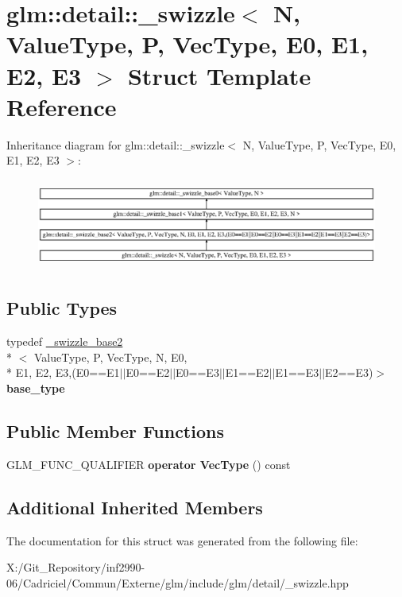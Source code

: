\hypertarget{structglm_1_1detail_1_1__swizzle}{\section{glm\-:\-:detail\-:\-:\-\_\-swizzle$<$ N, Value\-Type, P, Vec\-Type, E0, E1, E2, E3 $>$ Struct Template Reference}
\label{structglm_1_1detail_1_1__swizzle}
}
Inheritance diagram for glm\-:\-:detail\-:\-:\-\_\-swizzle$<$ N, Value\-Type, P, Vec\-Type, E0, E1, E2, E3 $>$\-:\begin{figure}[H]
\begin{center}
\leavevmode
\includegraphics[height=3.002681cm]{structglm_1_1detail_1_1__swizzle}
\end{center}
\end{figure}
\subsection*{Public Types}
\begin{DoxyCompactItemize}
\item 
\hypertarget{structglm_1_1detail_1_1__swizzle_acf7dfa9d7456eb833c247473c5a045f4}{typedef \hyperlink{structglm_1_1detail_1_1__swizzle__base2}{\-\_\-swizzle\-\_\-base2}\\*
$<$ Value\-Type, P, Vec\-Type, N, E0, \\*
E1, E2, E3,(E0==E1$\vert$$\vert$E0==E2$\vert$$\vert$E0==E3$\vert$$\vert$E1==E2$\vert$$\vert$E1==E3$\vert$$\vert$E2==E3)$>$ {\bfseries base\-\_\-type}}\label{structglm_1_1detail_1_1__swizzle_acf7dfa9d7456eb833c247473c5a045f4}

\end{DoxyCompactItemize}
\subsection*{Public Member Functions}
\begin{DoxyCompactItemize}
\item 
\hypertarget{structglm_1_1detail_1_1__swizzle_a333cdd33d2fb442775cca23c77e63fca}{G\-L\-M\-\_\-\-F\-U\-N\-C\-\_\-\-Q\-U\-A\-L\-I\-F\-I\-E\-R {\bfseries operator Vec\-Type} () const }\label{structglm_1_1detail_1_1__swizzle_a333cdd33d2fb442775cca23c77e63fca}

\end{DoxyCompactItemize}
\subsection*{Additional Inherited Members}


The documentation for this struct was generated from the following file\-:\begin{DoxyCompactItemize}
\item 
X\-:/\-Git\-\_\-\-Repository/inf2990-\/06/\-Cadriciel/\-Commun/\-Externe/glm/include/glm/detail/\-\_\-swizzle.\-hpp\end{DoxyCompactItemize}
